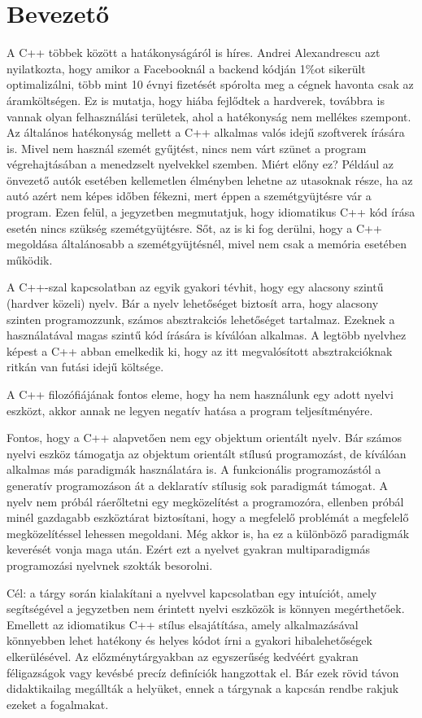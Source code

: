 \documentclass[a4paper,11.5pt,table]{article}
\begin{document}
	\section{Bevezető}
	A C++ többek között a hatákonyságáról is híres. Andrei Alexandrescu azt nyilatkozta, hogy amikor a Facebooknál a backend kódján 1\%ot sikerült optimalizálni, több mint 10 évnyi fizetését spórolta meg a cégnek havonta csak az áramköltségen. Ez is mutatja, hogy hiába fejlődtek a hardverek, továbbra is vannak olyan felhasználási területek, ahol a hatékonyság nem mellékes szempont. Az általános hatékonyság mellett a C++ alkalmas valós idejű szoftverek írására is. Mivel nem használ szemét gyűjtést, nincs nem várt szünet a program végrehajtásában a menedzselt nyelvekkel szemben. Miért előny ez? Például az önvezető autók esetében kellemetlen élményben lehetne az utasoknak része, ha az autó azért nem képes időben fékezni, mert éppen a szemétgyüjtésre vár a program. Ezen felül, a jegyzetben megmutatjuk, hogy idiomatikus C++ kód írása esetén nincs szükség szemétgyüjtésre. Sőt, az is ki fog derülni, hogy a C++ megoldása általánosabb a szemétgyüjtésnél, mivel nem csak a memória esetében működik.

	A C++-szal kapcsolatban az egyik gyakori tévhit, hogy egy alacsony szintű (hardver közeli) nyelv. Bár a nyelv lehetőséget biztosít arra, hogy alacsony szinten programozzunk, számos absztrakciós lehetőséget tartalmaz. Ezeknek a használatával magas szintű kód írására is kíválóan alkalmas. A legtöbb nyelvhez képest a C++ abban emelkedik ki, hogy az itt megvalósított absztrakcióknak ritkán van futási idejű költsége.
	
	A C++ filozófiájának fontos eleme, hogy ha nem használunk egy adott nyelvi eszközt, akkor annak ne legyen negatív hatása a program teljesítményére.
	
	Fontos, hogy a C++ alapvetően nem egy objektum orientált nyelv. Bár számos nyelvi eszköz támogatja az objektum orientált stílusú programozást, de kíválóan alkalmas más paradigmák használatára is. A funkcionális programozástól a generatív programozáson át a deklaratív stílusig sok paradigmát támogat. A nyelv nem próbál ráerőltetni egy megközelítést a programozóra, ellenben próbál minél gazdagabb eszköztárat biztosítani, hogy a megfelelő problémát a megfelelő megközelítéssel lehessen megoldani. Még akkor is, ha ez a különböző paradigmák keverését vonja maga után. Ezért ezt a nyelvet gyakran multiparadigmás programozási nyelvnek szokták besorolni. 

	\medskip
	Cél: a tárgy során kialakítani a nyelvvel kapcsolatban egy intuíciót, amely segítségével a jegyzetben nem érintett nyelvi eszközök is könnyen megérthetőek. Emellett az idiomatikus C++ stílus elsajátítása, amely alkalmazásával könnyebben lehet hatékony és helyes kódot írni a gyakori hibalehetőségek elkerülésével. Az előzménytárgyakban az egyszerűség kedvéért gyakran féligazságok vagy kevésbé precíz definíciók hangzottak el. Bár ezek rövid távon didaktikailag megállták a helyüket, ennek a tárgynak a kapcsán rendbe rakjuk ezeket a fogalmakat.
\end{document}

